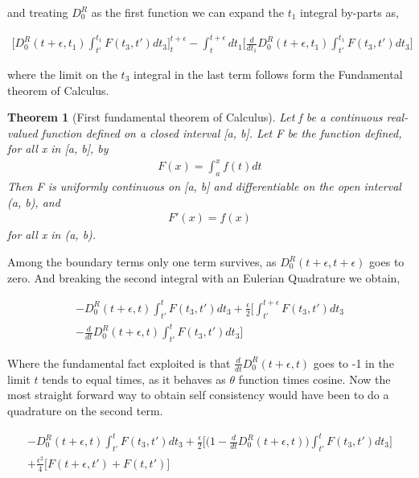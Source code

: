 \documentclass{amsart}
\newtheorem{thm}[]{Theorem}
\begin{document}
    and treating $D_0^R$ as the first function we can expand the $t_1$ integral by-parts as,
    
        \begin{multline}\label{byparts1}
            \Big[D_0^R(t+\epsilon, t_1)\int^{t_1}_{t'}F(t_3,t')dt_3 \Big]^{t+\epsilon}_{t}-\int^{t+\epsilon}_t dt_1 \Big[\frac{d}{dt_1} D_0^R(t+\epsilon,t_1)\int^{t_1}_{t'} F(t_3,t')dt_3\Big]
        \end{multline} 
    
    where the limit on the $t_3$ integral in the last term follows form the Fundamental theorem of Calculus. 
    
    \begin{thm}[First fundamental theorem of Calculus]
        
        Let f be a continuous real-valued function defined on a closed interval [a, b]. Let F be the function defined, for all x in [a, b], by
            \begin{align*}
              F ( x ) = \int_a^x f ( t ) d t   
            \end{align*}
        Then F is uniformly continuous on [a, b] and differentiable on the open interval (a, b), and
            \begin{align*}
                 F' ( x ) = f ( x )
            \end{align*}
        for all x in (a, b). 
    \end{thm}
    
     Among the boundary terms only one term survives, as $D_0^R(t+\epsilon,t+\epsilon)$ goes to zero. And breaking the second integral with an Eulerian Quadrature we obtain,
    
        \begin{multline}\label{byparts2}
            -D_0^R(t+\epsilon, t)\int^{t}_{t'}F(t_3,t')dt_3 +\frac{\epsilon}{2} \Big[ \int^{t+\epsilon}_{t'} F(t_3,t')dt_3 \\-\frac{d}{dt} D_0^R(t+\epsilon,t)\int^{t}_{t'} F(t_3,t')dt_3\Big]
        \end{multline} 
        
    Where the fundamental fact exploited is that $\frac{d}{dt}D_0^R(t+\epsilon,t)$ goes to -1 in the limit $t$ tends to equal times, as it behaves as $\theta$ function times cosine. Now the most straight forward way to obtain self consistency would have been to do a quadrature on the second  term.
    
        \begin{multline}\label{byparts3}
            -D_0^R(t+\epsilon, t)\int^{t}_{t'}F(t_3,t')dt_3 +\frac{\epsilon}{2} \Big[ \Big(1-\frac{d}{dt}D_0^R(t+\epsilon,t)\Big)\int^{t}_{t'} F(t_3,t')dt_3 ]\\ +\frac{\epsilon^2}{4} \Big[ F(t+\epsilon,t')+F(t,t') \Big]
        \end{multline} 
    
\end{document}

